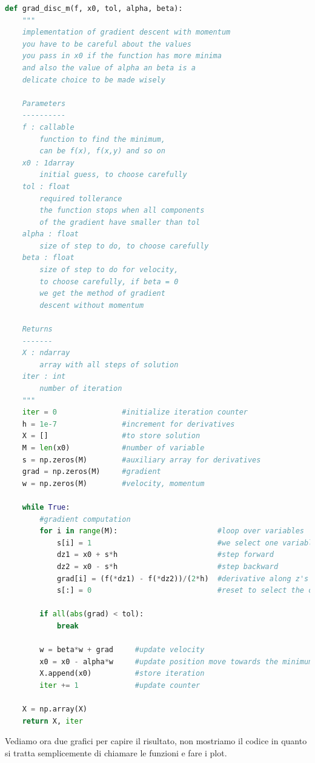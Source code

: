 \documentclass[10pt,a4paper]{article}
\begin{document}
\begin{lstlisting}[language=Python]
def grad_disc_m(f, x0, tol, alpha, beta):
    """
    implementation of gradient descent with momentum
    you have to be careful about the values
    you pass in x0 if the function has more minima
    and also the value of alpha an beta is a
    delicate choice to be made wisely

    Parameters
    ----------
    f : callable
        function to find the minimum,
        can be f(x), f(x,y) and so on
    x0 : 1darray
        initial guess, to choose carefully
    tol : float
        required tollerance
        the function stops when all components
        of the gradient have smaller than tol
    alpha : float
        size of step to do, to choose carefully
    beta : float
        size of step to do for velocity,
        to choose carefully, if beta = 0
        we get the method of gradient
        descent without momentum

    Returns
    -------
    X : ndarray
        array with all steps of solution
    iter : int
        number of iteration
    """
    iter = 0               #initialize iteration counter
    h = 1e-7               #increment for derivatives
    X = []                 #to store solution
    M = len(x0)            #number of variable
    s = np.zeros(M)        #auxiliary array for derivatives
    grad = np.zeros(M)     #gradient
    w = np.zeros(M)        #velocity, momentum

    while True:
        #gradient computation
        for i in range(M):                       #loop over variables
            s[i] = 1                             #we select one variable at a time
            dz1 = x0 + s*h                       #step forward
            dz2 = x0 - s*h                       #step backward
            grad[i] = (f(*dz1) - f(*dz2))/(2*h)  #derivative along z's direction
            s[:] = 0                             #reset to select the other variables

        if all(abs(grad) < tol):
            break

        w = beta*w + grad     #update velocity
        x0 = x0 - alpha*w     #update position move towards the minimum
        X.append(x0)          #store iteration
        iter += 1             #update counter

    X = np.array(X)
    return X, iter
\end{lstlisting}

Vediamo ora due grafici per capire il risultato, non mostriamo il codice in quanto si tratta semplicemente di chiamare le funzioni e fare i plot.
\end{document}
